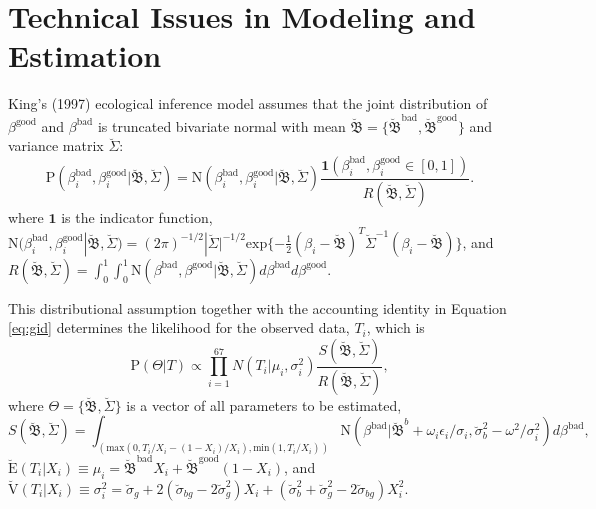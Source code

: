 \documentclass[11pt,titlepage]{article}
\newcommand{\bbetau}{\breve{\mathfrak B}}
\newcommand{\sigmau}{\breve{\sigma}}
\newcommand{\Sigmau}{\breve{\Sigma}}
\newcommand{\Eu}{\breve{\text{E}}}
\newcommand{\Vu}{\breve{\text{V}}}
\newcommand{\N}{\text{N}}
\renewcommand{\P}{\text{P}}
\newcommand{\bb}{\beta^{\text{bad}}}
\newcommand{\bg}{\beta^{\text{good}}}
\begin{document}
\appendix
\section{Technical Issues in Modeling and Estimation} \label{appx:king}

King's (1997) ecological inference model assumes that the joint
distribution of $\bg$ and $\bb$ is truncated bivariate normal with
mean $\bbetau=\{\bbetau^{\text{bad}},\bbetau^{\text{good}}\}$
and variance matrix $\Sigmau$:
\begin{equation}
\P(\bb_i, \bg_i | \bbetau, \Sigmau)  = 
 \N (\bb_i, \bg_i | \bbetau, \Sigmau)
\frac{\mathbf{1}(\bb_i, \bg_i \in [0,1])}
{R(\bbetau, \Sigmau)}.
\end{equation}
where $\mathbf{1}$ is the indicator function, $\N (\bb_i, \bg_i |
\bbetau, \Sigmau) = (2 \pi)^{-1/2} |\Sigmau|^{-1/2} \text{exp} \{ -
\frac{1}{2} (\beta_i-\bbetau)^T \Sigmau^{-1} (\beta_i - \bbetau) \}$,
and $R (\bbetau, \Sigmau) = \int_0^1 \int_0^1 \N (\bb, \bg | \bbetau,
\Sigmau) d\bb d\bg$.

This distributional assumption together with the accounting identity
in Equation \ref{eq:gid} determines the likelihood for the observed
data, $T_i$, which is
\begin{equation}
  \P(\Theta|T) \propto \prod_{i=1}^{67} N(T_i|\mu_i, \sigma_i^2)
  \frac{S(\bbetau, \Sigmau)}{R(\bbetau, \Sigmau)}, \label{eq:likelihood}
\end{equation}
where $\Theta=\{\bbetau,\Sigmau\}$ is a vector of all parameters to be
estimated,
\begin{equation}
  S(\bbetau, \Sigmau)=\int_{(\text{max}(0, T_i/X_i-(1-X_i)/X_i),
    \text{min}(1,T_i/X_i))} \N(\bb|\bbetau^b + \omega_i \epsilon_i /
  \sigma_i, \sigmau^2_b-\omega^2/\sigma^2_i)d\bb,
\end{equation}
$\Eu(T_i|X_i)\equiv\mu_i = \bbetau^{\text{bad}} X_i +
\bbetau^{\text{good}} (1-X_i)$, and
$\Vu(T_i|X_i)\equiv\sigma^2_i=\sigmau_g + 2(\sigmau_{bg} - 2
\sigmau_g^2) X_i + (\sigmau_b^2 + \sigmau_g^2 - 2\sigmau_{bg}) X_i^2$.
\end{document}
